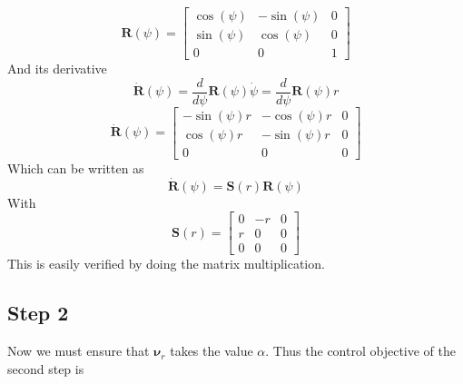 \documentclass[12pt,a4]{article}
\begin{document}
\begin{equation}
	\bm{R}(\psi) = \begin{bmatrix} \cos(\psi) & -\sin(\psi) & 0 \\ \sin(\psi) & \cos(\psi) & 0 \\ 0 & 0 & 1 \end{bmatrix}
\end{equation}
And its derivative
\begin{equation}
	\bm{\dot{R}}(\psi) = \dfrac{d}{d\psi} \bm{R}(\psi) \dot{\psi} =  \dfrac{d}{d\psi} \bm{R}(\psi) r
\end{equation}
\begin{equation}
	\bm{\dot{R}}(\psi) = \begin{bmatrix} -\sin(\psi)r & -\cos(\psi)r & 0 \\ \cos(\psi)r & -\sin(\psi)r & 0 \\ 0 & 0 & 0 \end{bmatrix}
\end{equation}
Which can be written as
\begin{equation}
	\bm{\dot{R}}(\psi) = \bm{S}(r)\bm{R}(\psi)
\end{equation}
With
\begin{equation}
	\bm{S}(r) = \begin{bmatrix} 0 & -r & 0 \\ r & 0 & 0 \\ 0 & 0 & 0 \end{bmatrix}
\end{equation}
This is easily verified by doing the matrix multiplication.

\subsection{Step 2}
Now we must ensure that $\bm{\nu}_r$ takes the value $\alpha$. Thus the control objective
of the second step is
\end{document}

